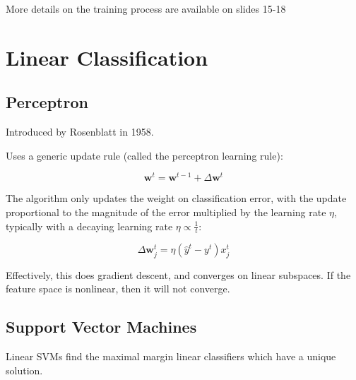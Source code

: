 \documentclass{idc_msc}
\begin{document}

More details on the training process are available on slides 15-18

\clearpage
\section{Linear Classification}

\subsection{Perceptron}

Introduced by Rosenblatt in 1958.

Uses a generic update rule (called the perceptron learning rule):

\[\mathbf{w}^t = \mathbf{w}^{t-1} + \Delta \mathbf{w}^t\]

The algorithm only updates the weight on classification error, with the update proportional to the magnitude of the error multiplied by the learning rate \(\eta\), typically with a decaying learning rate \(\eta \propto \frac{1}{t}\):

\[\Delta \mathbf{w}^t_j = \eta (\hat{y}^t - y^t) x^t_j\]


Effectively, this does gradient descent, and converges on linear subspaces.
If the feature space is nonlinear, then it will not converge.


\subsection{Support Vector Machines}

Linear SVMs find the maximal margin linear classifiers which have a unique solution.



\end{document}
